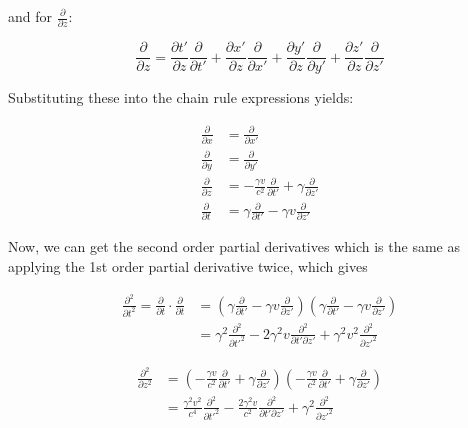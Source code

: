 \begin{derivation}
	and for $\frac{\partial}{\partial z}$:

	\begin{equation}
		\frac{\partial}{\partial z} = \frac{\partial t'}{\partial z} \frac{\partial}{\partial t'} + \frac{\partial x'}{\partial z} \frac{\partial}{\partial x'} + \frac{\partial y'}{\partial z} \frac{\partial}{\partial y'} + \frac{\partial z'}{\partial z} \frac{\partial}{\partial z'}
	\end{equation}

	Substituting these into the chain rule expressions yields:

	\begin{equation}
		\begin{aligned}
			\frac{\partial}{\partial x} & = \frac{\partial}{\partial x'}                                                             \\
			\frac{\partial}{\partial y} & = \frac{\partial}{\partial y'}                                                             \\
			\frac{\partial}{\partial z} & = -\frac{\gamma v}{c^2} \frac{\partial}{\partial t'} + \gamma \frac{\partial}{\partial z'} \\
			\frac{\partial}{\partial t} & = \gamma \frac{\partial}{\partial t'} - \gamma v \frac{\partial}{\partial z'}
		\end{aligned}
	\end{equation}

	Now, we can get the second order partial derivatives which is the same as applying the 1st order partial derivative twice, which gives

	\begin{equation}
		\begin{aligned}
			\frac{\partial^2}{\partial t^2} = \frac{\partial}{\partial t} \cdot \frac{\partial}{\partial t} & = \left(\gamma \frac{\partial}{\partial t'} - \gamma v \frac{\partial}{\partial z'}\right) \left(\gamma \frac{\partial}{\partial t'} - \gamma v \frac{\partial}{\partial z'}\right) \\
			                                                                                                & = \gamma^2 \frac{\partial^2}{\partial t'^2} - 2\gamma^2 v \frac{\partial^2}{\partial t'\partial z'} + \gamma^2 v^2 \frac{\partial^2}{\partial z'^2}
		\end{aligned}
	\end{equation}

	\begin{equation}
		\begin{aligned}
			\frac{\partial^2}{\partial z^2} & = \left(-\frac{\gamma v}{c^2} \frac{\partial}{\partial t'} + \gamma \frac{\partial}{\partial z'}\right) \left(-\frac{\gamma v}{c^2} \frac{\partial}{\partial t'} + \gamma \frac{\partial}{\partial z'}\right) \\
			& = \frac{\gamma^2 v^2}{c^4} \frac{\partial^2}{\partial t'^2} - \frac{2\gamma^2 v}{c^2} \frac{\partial^2}{\partial t'\partial z'} + \gamma^2 \frac{\partial^2}{\partial z'^2}
		\end{aligned}
	\end{equation}


\end{derivation}
